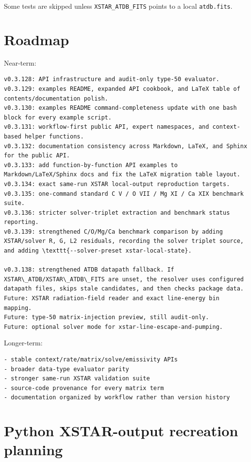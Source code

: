 \documentclass[11pt]{article}
\begin{document}
Some tests are skipped unless \texttt{XSTAR\_ATDB\_FITS} points to a local \texttt{atdb.fits}.

\section{Roadmap}

Near-term:

\begin{lstlisting}[style=ctterminal]
v0.3.128: API infrastructure and audit-only type-50 evaluator.
v0.3.129: examples README, expanded API cookbook, and LaTeX table of contents/documentation polish.
v0.3.130: examples README command-completeness update with one bash block for every example script.
v0.3.131: workflow-first public API, expert namespaces, and context-based helper functions.
v0.3.132: documentation consistency across Markdown, LaTeX, and Sphinx for the public API.
v0.3.133: add function-by-function API examples to Markdown/LaTeX/Sphinx docs and fix the LaTeX migration table layout.
v0.3.134: exact same-run XSTAR local-output reproduction targets.
v0.3.135: one-command standard C V / O VII / Mg XI / Ca XIX benchmark suite.
v0.3.136: stricter solver-triplet extraction and benchmark status reporting.
v0.3.139: strengthened C/O/Mg/Ca benchmark comparison by adding XSTAR/solver R, G, L2 residuals, recording the solver triplet source, and adding \texttt{--solver-preset xstar-local-state}.

v0.3.138: strengthened ATDB datapath fallback. If XSTAR\_ATDB/XSTAR\_ATDB\_FITS are unset, the resolver uses configured datapath files, skips stale candidates, and then checks package data.
Future: XSTAR radiation-field reader and exact line-energy bin mapping.
Future: type-50 matrix-injection preview, still audit-only.
Future: optional solver mode for xstar-line-escape-and-pumping.
\end{lstlisting}

Longer-term:

\begin{lstlisting}[style=ctterminal]
- stable context/rate/matrix/solve/emissivity APIs
- broader data-type evaluator parity
- stronger same-run XSTAR validation suite
- source-code provenance for every matrix term
- documentation organized by workflow rather than version history
\end{lstlisting}


\section{Python XSTAR-output recreation planning}
\end{document}
